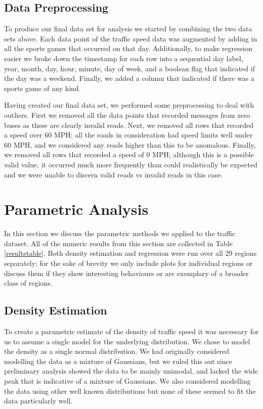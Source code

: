 \documentclass[12pt]{article}
\begin{document}
\subsection{Data Preprocessing}
To produce our final data set for analysis we started by combining the two data sets above. Each data point of the traffic speed data was augmented by adding in all the sports games that occurred on that day. Additionally, to make regression easier we broke down the timestamp for each row into a sequential day label, year, month, day, hour, minute, day of week, and a boolean flag that indicated if the day was a weekend. Finally, we added a column that indicated if there was a sports game of any kind.

Having created our final data set, we performed some preprocessing to deal with outliers. First we removed all the data points that recorded messages from zero buses as these are clearly invalid reads. Next, we removed all rows that recorded a speed over 60 MPH; all the roads in consideration had speed limits well under 60 MPH, and we considered any reads higher than this to be anomalous. Finally, we removed all rows that recorded a speed of 0 MPH; although this is a possible valid value, it occurred much more frequently than could realistically be expected and we were unable to discern valid reads vs invalid reads in this case.
\section{Parametric Analysis}
In this section we discuss the parametric methods we applied to the traffic dataset. All of the numeric results from this section are collected in Table \ref{resultstable}. Both density estimation and regression were run over all 29 regions separately; for the sake of brevity we only include plots for individual regions or discuss them if they show interesting behaviours or are exemplary of a broader class of regions.
\subsection{Density Estimation}
To create a parametric estimate of the density of traffic speed it was necessary for us to assume a single model for the underlying distribution. We chose to model the density as a single normal distribution. We had originally considered modelling the data as a mixture of Gaussians, but we ruled this out since preliminary analysis showed the data to be mainly unimodal, and lacked the wide peak that is indicative of a mixture of Gaussians. We also considered modelling the data using other well known distributions but none of these seemed to fit the data particularly well.
\end{document}
